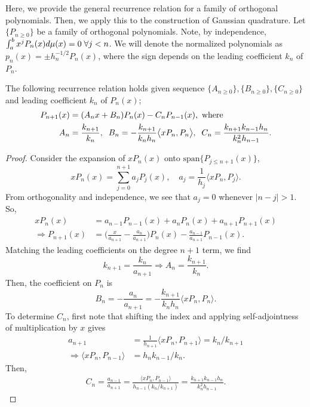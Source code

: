 Here, we provide the general recurrence relation for a family of orthogonal polynomials. Then, we apply this to the construction of Gaussian quadrature. Let $\{P_{n\geq 0}\}$ be a family of orthogonal polynomials. Note, by independence, $\int_a^bx^jP_n(x)d\mu(x) = 0 \; \forall j < n$. We will denote the normalized polynomials as $p_n(x) = \pm h_{n}^{-1/2}P_n(x)$, where the sign depends on the leading coefficient $k_n$ of $P_n$.
\begin{proposition}\normalfont
The following recurrence relation holds given sequence $\{A_{n\geq 0}\},\{B_{n\geq0}\},\{C_{n\geq0}\}$ and leading coefficient $k_n$ of $P_n(x)$;
\begin{equation}
\begin{split}
P_{n+1}(x) &= (A_n x + B_n)P_n(x) - C_nP_{n-1}(x), \text{ where} \\A_n &= \frac{k_{n+1}}{k_n},\; \; B_n = -\frac{k_{n+1}}{k_nh_n}\big\langle xP_n,P_n\big\rangle,\; \; C_n = \frac{k_{n+1}k_{n-1}h_n}{k_n^2h_{n-1}}.
\end{split}
\end{equation}
\end{proposition}
\begin{proof}
Consider the expansion of $xP_n(x)$ onto $\text{span}\{P_{j\leq n+1}(x)\}$, $$xP_n(x) = \sum_{j=0}^{n+1}a_jP_j(x), \quad a_j = \frac{1}{h_j}\big\langle xP_n,P_j\big\rangle.$$ From orthogonality and independence, we see that $a_j = 0$ whenever $|n-j| > 1$. So,
\begin{align*}
xP_n(x) &= a_{n-1}P_{n-1}(x) + a_nP_n(x) + a_{n+1}P_{n+1}(x)\\
\Rightarrow P_{n+1}(x) &= \big(\frac{x}{a_{n+1}} - \frac{a_n}{a_{n+1}}\big)P_n(x) - \frac{a_{n-1}}{a_{n+1}}P_{n-1}(x).
\end{align*}
Matching the leading coefficients on the degree $n+1$ term, we find
\begin{equation*}
k_{n+1} = \frac{k_n}{a_{n+1}} \Rightarrow A_n = \frac{k_{n+1}}{k_n}.
\end{equation*}
Then, the coefficient on $P_n$ is
\begin{equation*}
B_n = -\frac{a_n}{a_{n+1}} = -\frac{k_{n+1}}{k_nh_n}\big\langle xP_n,P_n\big\rangle.
\end{equation*}
To determine $C_n$, first note that shifting the index and applying self-adjointness of multiplication by $x$ gives
\begin{align*}
a_{n+1} &= \frac{1}{h_{n+1}}\big\langle xP_n,P_{n+1}\big\rangle = k_n/k_{n+1}\\
 \Rightarrow \langle xP_n,P_{n-1}\big\rangle &= h_nk_{n-1}/k_n.
\end{align*}
Then, 
\begin{align*}
C_n = \frac{a_{n-1}}{a_{n+1}} = \frac{\big\langle xP_n,P_{n-1}\big\rangle}{h_{n-1}(k_n/k_{n+1})} = \frac{k_{n+1}k_{n-1}h_n}{k_n^2h_{n-1}}.
\end{align*}
\end{proof}
